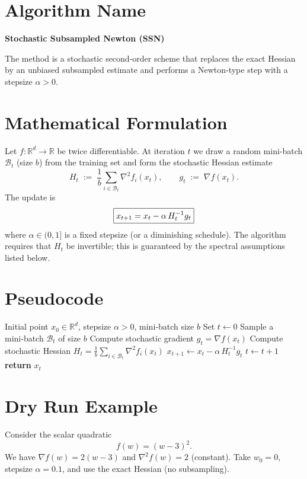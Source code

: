 \documentclass[11pt]{article}
\newcommand{\R}{\mathbb{R}}
\begin{document}
\section*{Algorithm Name}
\textbf{Stochastic Subsampled Newton (SSN)}  

The method is a stochastic second‑order scheme that replaces the exact Hessian
by an unbiased subsampled estimate and performs a Newton‑type step with a
stepsize $\alpha>0$.

\section*{Mathematical Formulation}
Let $f:\R^{d}\rightarrow\R$ be twice differentiable.  
At iteration $t$ we draw a random mini‑batch $\mathcal{B}_{t}$ (size $b$) from the
training set and form the stochastic Hessian estimate
\[
H_{t}\;:=\;\frac{1}{b}\sum_{i\in\mathcal{B}_{t}}\nabla^{2}f_{i}(x_{t}),
\qquad 
g_{t}\;:=\;\nabla f(x_{t}) .
\]
The update is
\begin{equation}
\boxed{%
x_{t+1}=x_{t}-\alpha\,H_{t}^{-1}g_{t}}
\label{eq:update}
\end{equation}
where $\alpha\in(0,1]$ is a fixed stepsize (or a diminishing schedule).  
The algorithm requires that $H_{t}$ be invertible; this is guaranteed
by the spectral assumptions listed below.

\section*{Pseudocode}
\begin{algorithm}[H]
\caption{Stochastic Subsampled Newton (SSN)}
\begin{algorithmic}[1]
\Require Initial point $x_{0}\in\R^{d}$, stepsize $\alpha>0$, mini‑batch size $b$
\State Set $t\gets 0$
    \State Sample a mini‑batch $\mathcal{B}_{t}$ of size $b$
    \State Compute stochastic gradient $g_{t}= \nabla f(x_{t})$   
    \State Compute stochastic Hessian $H_{t}= \frac{1}{b}\sum_{i\in\mathcal{B}_{t}}\nabla^{2}f_{i}(x_{t})$
    \State $x_{t+1}\gets x_{t}-\alpha\,H_{t}^{-1}g_{t}$ 
    \State $t\gets t+1$
\EndWhile
\State \textbf{return} $x_{t}$
\end{algorithmic}
\end{algorithm}

\section*{Dry Run Example}
Consider the scalar quadratic
\[
f(w)=(w-3)^{2}.
\]
We have $\nabla f(w)=2(w-3)$ and $\nabla^{2}f(w)=2$ (constant).  
Take $w_{0}=0$, stepsize $\alpha=0.1$, and use the exact Hessian (no
subsampling).  
\end{document}
